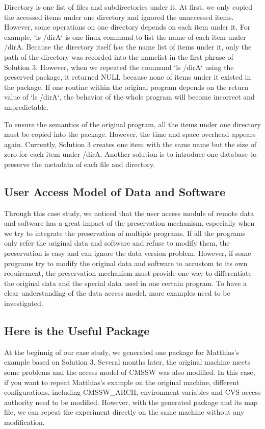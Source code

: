 \documentclass{acm_proc_article-sp}
\begin{document}
Directory is one list of files and subdirectories under it. At first, we only
copied the accessed items under one directory and ignored the unaccessed items.
However, some operations on one directory depends on each item under it. For
example, `ls /dirA` is one linux command to list the name of each item under
/dirA. Because the directory itself has the name list of items under it, only
the path of the directory was recorded into the namelist in the first phrase of
Solution 3. However, when we repeated the command `ls /dirA` using the
preserved package, it returned NULL because none of items under it existed in
the package. If one routine within the original program depends on the return
value of `ls /dirA`, the behavior of the whole program will become incorrect
and unpredictable. 

To ensure the semantics of the original program, all the items under one directory must be copied
into the package. However, the
time and space overhead appears again. Currently, Solution 3 creates one item
with the same name but the size of zero for each item under /dirA. Another
solution is to introduce one database to preserve the metadata of each file and
directory. 

\subsection{User Access Model of Data and Software}

Through this case study, we noticed that the user access module of remote data
and software has a great impact of the preservation mechanism, especially when
we try to integrate the preservation of multiple programs. If all the programs
only refer the original data and software and refuse to modify them, the
preservation is easy and can ignore the data version problem. However, if some
programs try to modify the original data and software to accustom to its own
requirement, the preservation mechanism must provide one way to differentiate
the original data and the special data used in one certain
program. To have a clear understanding of the data access model, more examples
need to be investigated.

\subsection{Here is the Useful Package}

At the beginnig of our case study, we generated one package for Matthias's
example based on Solution 3. Several months later, the original machine meets
some problems and the access model of CMSSW was also modified. In this case, if
you want to repeat Matthias's example on the original machine, different 
configurations, including CMSSW\_ARCH, environment variables and CVS access
authority need to be modified. However, with the generated package and its map file, we can repeat the experiment directly on the same machine without any modification.
\end{document}
